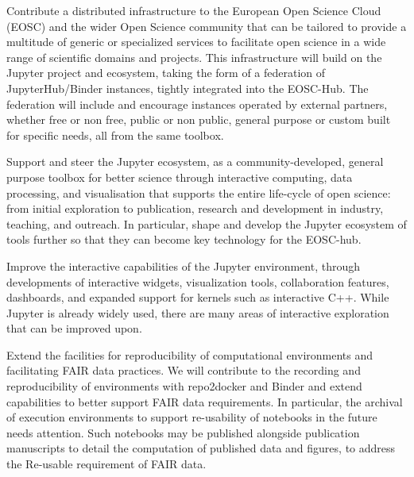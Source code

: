 \begin{compactenum}

\item \label{obj:deployment} %
  Contribute a distributed infrastructure to the European Open Science Cloud
  (EOSC) and the wider Open Science community that can be tailored to
  provide a multitude of generic or specialized services to facilitate
  open science in a wide range of scientific domains and projects.
  This infrastructure will build on the Jupyter project and ecosystem,
  taking the form of a federation of JupyterHub/Binder instances,
  tightly integrated into the EOSC-Hub.
  The federation will include and encourage instances operated by
  external partners, whether free or non free, public or non public,
  general purpose or custom built for specific needs, all from the
  same toolbox.

\item \label{obj:jupyter} %
  Support and steer the Jupyter ecosystem, as a community-developed,
  general purpose
  toolbox for better science through interactive computing, data
  processing, and
  visualisation that supports the entire life-cycle of open science:
  from initial exploration to publication, research and development in
  industry, teaching, and outreach. In particular, shape and develop
  the Jupyter ecosystem of tools further so that they can become key
  technology for the EOSC-hub.

\item \label{obj:interactivity} %
  Improve the interactive capabilities of the Jupyter environment,
  through developments of interactive widgets,
  visualization tools, collaboration features, dashboards,
  and expanded support for kernels such as interactive C++.
  While Jupyter is already widely used, there are many areas
  of interactive exploration that can be improved upon.

\item \label{obj:reusability} %
  Extend the facilities for reproducibility of computational environments
  and facilitating FAIR data practices.
  We will contribute to the recording and reproducibility
  of environments with repo2docker and Binder
  and extend capabilities to better support FAIR
  data requirements. In particular, the archival of execution
  environments to support re-usability of notebooks in the future
  needs attention. Such notebooks may be published alongside
  publication manuscripts to detail the computation of published data
  and figures, to address the Re-usable requirement of FAIR data.


\end{compactenum}
